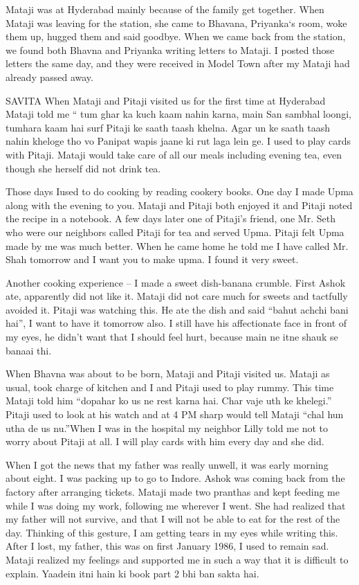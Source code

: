 Mataji was at Hyderabad mainly because of the family get together. When Mataji was leaving for the station, she came to Bhavana, Priyanka‘s room, woke them up, hugged them and said goodbye. When we came back from the station, we found both Bhavna and Priyanka writing letters to Mataji. I posted those letters the same day, and they were received in Model Town after my Mataji had already passed away.
 

SAVITA
When Mataji and Pitaji visited us for the first time at Hyderabad Mataji told me “ tum ghar ka kuch kaam nahin karna, main San sambhal loongi, tumhara kaam hai surf Pitaji ke saath taash khelna. Agar un ke saath taash nahin kheloge tho vo Panipat wapis jaane ki rut laga lein ge. I used to play cards with Pitaji. Mataji would take care of all our meals including evening tea, even though she herself did not drink tea. 

Those days Iused to do cooking by reading cookery books. One day I made Upma along with the evening to you. Mataji and Pitaji both enjoyed it and Pitaji noted the recipe in a notebook. A few days later one of Pitaji’s friend, one Mr. Seth who were our neighbors called Pitaji for tea and served Upma. Pitaji felt Upma made by me was much better. When he came home he told me I have called Mr. Shah tomorrow and I want you to make upma. I found it very sweet.

Another cooking experience – I made a sweet dish-banana crumble. First Ashok ate, apparently did not like it. Mataji did not care much for sweets and tactfully avoided it. Pitaji was watching this. He ate the dish and said “bahut achchi bani hai”, I want to have it tomorrow also. I still have his affectionate face in front of my eyes, he didn’t want that I should feel hurt, because main ne itne shauk se banaai thi. 

When Bhavna was about to be born, Mataji and Pitaji visited us. Mataji as usual, took charge of kitchen and I and Pitaji used to play rummy. This time Mataji told him “dopahar ko us ne rest karna hai. Char vaje uth ke khelegi.” Pitaji used to look at his watch and at 4 PM sharp would tell Mataji “chal hun utha de us nu.”When I was in the hospital my neighbor Lilly told me not to worry about Pitaji at all. I will play cards with him every day and she did.

When I got the news that my father was really unwell, it was early morning about eight. I was packing up to go to Indore. Ashok was coming back from the factory after arranging tickets. Mataji made two pranthas and kept feeding me while I was doing my work, following me wherever I went. She had realized that my father will not survive, and that I will not be able to eat for the rest of the day. Thinking of this gesture, I am getting tears in my eyes while writing this. 
After I lost, my father, this was on first January 1986, I used to remain sad. Mataji realized my feelings and supported me in such a way that it is difficult to explain. 
Yaadein itni hain ki book part 2 bhi ban sakta hai. 





